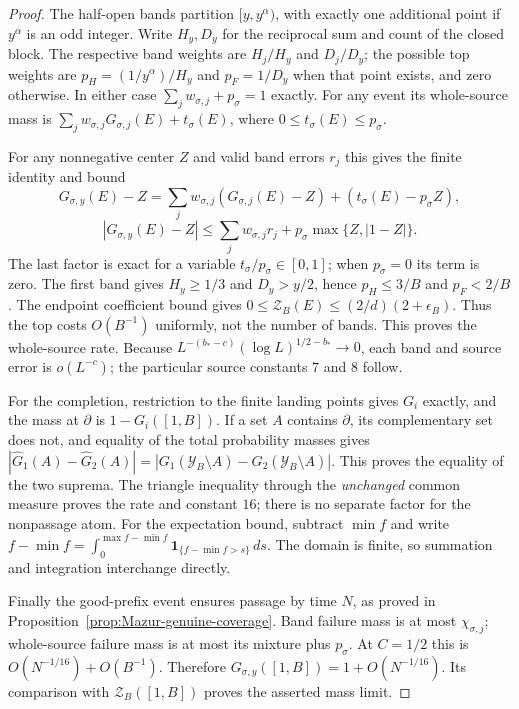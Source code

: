 \begin{proof}
The half-open bands partition $[y,y^\alpha)$, with exactly one additional
point if $y^\alpha$ is an odd integer. Write $H_y,D_y$ for the reciprocal
sum and count of the closed block. The respective band weights are
$H_j/H_y$ and $D_j/D_y$; the possible top weights are
$p_H=(1/y^\alpha)/H_y$ and $p_F=1/D_y$ when that point exists, and zero
otherwise. In either case $\sum_jw_{\sigma,j}+p_\sigma=1$ exactly.
For any event its whole-source mass is
$\sum_jw_{\sigma,j}G_{\sigma,j}(E)+t_\sigma(E)$, where
$0\le t_\sigma(E)\le p_\sigma$.

For any nonnegative center $Z$ and valid band errors $r_j$ this gives
the finite identity and bound
\[
 G_{\sigma,y}(E)-Z
 =\sum_jw_{\sigma,j}(G_{\sigma,j}(E)-Z)+(t_\sigma(E)-p_\sigma Z),
\]
\[
 |G_{\sigma,y}(E)-Z|
 \le\sum_jw_{\sigma,j}r_j+
       p_\sigma\max\{Z,|1-Z|\}.
\]
The last factor is exact for a variable $t_\sigma/p_\sigma\in[0,1]$;
when $p_\sigma=0$ its term is zero. The first band gives
$H_y\ge1/3$ and $D_y>y/2$, hence $p_H\le3/B$ and $p_F<2/B$.
The endpoint coefficient bound gives
$0\le\mathcal Z_B(E)\le(2/d)(2+\epsilon_B)$.
Thus the top costs $O(B^{-1})$ uniformly, not the number of bands.
This proves the whole-source rate. Because
$L^{-(b_*-c)}(\log L)^{1/2-b_*}\to0$, each band and source error
is $o(L^{-c})$; the particular source constants $7$ and $8$ follow.

For the completion, restriction to the finite landing points gives $G_i$
exactly, and the mass at $\partial$ is $1-G_i([1,B])$. If a set $A$
contains $\partial$, its complementary set does not, and equality of the
total probability masses gives
$|\widehat G_1(A)-\widehat G_2(A)|
 =|G_1(\mathcal Y_B\setminus A)-G_2(\mathcal Y_B\setminus A)|$.
This proves the equality of the two suprema. The triangle inequality
through the \emph{unchanged} common measure proves the rate and constant
$16$; there is no separate factor for the nonpassage atom.
For the expectation bound, subtract $\min f$ and write
$f-\min f=\int_0^{\max f-\min f}\mathbf1_{\{f-\min f>s\}}\,ds$.
The domain is finite, so summation and integration interchange directly.

Finally the good-prefix event ensures passage by time $N$, as proved in
Proposition~\ref{prop:Mazur-genuine-coverage}. Band failure mass is at most
$\chi_{\sigma,j}$; whole-source failure mass is at most its mixture plus
$p_\sigma$. At $C=1/2$ this is $O(N^{-1/16})+O(B^{-1})$.
Therefore $G_{\sigma,y}([1,B])=1+O(N^{-1/16})$.
Its comparison with $\mathcal Z_B([1,B])$ proves the asserted mass limit.
\end{proof}

